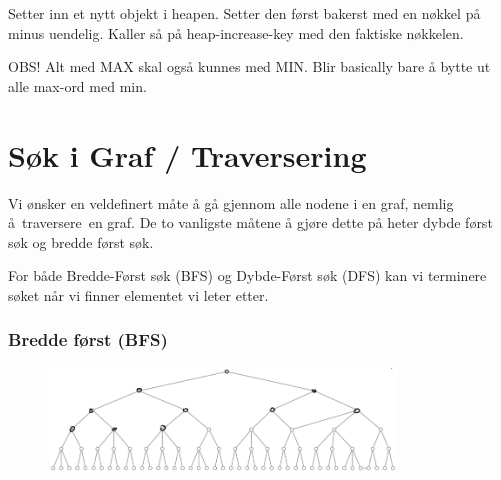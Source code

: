 \documentclass[12pt]{report}
\begin{document}
Setter inn et nytt objekt i heapen. Setter den først bakerst med en nøkkel på minus uendelig. Kaller så på heap-increase-key med den faktiske nøkkelen. \par


\vspace{\baselineskip}
OBS! Alt med MAX skal også kunnes med MIN. Blir basically bare å bytte ut alle max-ord med min. \par




\newpage

\vspace{\baselineskip}\setlength{\parskip}{15.0pt}
\section*{Søk i Graf / Traversering}
\setlength{\parskip}{0.0pt}
Vi ønsker en veldefinert måte å gå gjennom alle nodene i en graf, nemlig å traversere en graf. De to vanligste måtene å gjøre dette på heter dybde først søk og bredde først søk.\par

\setlength{\parskip}{10.56pt}
For både Bredde-Først søk (BFS) og Dybde-Først søk (DFS) kan vi terminere søket når vi finner elementet vi leter etter.\par


\vspace{\baselineskip}
\setlength{\parskip}{6.0pt}
\subsubsection*{Bredde først (BFS)}



\begin{figure}[H]
\advance\leftskip 3.29in		\includegraphics[width=3.64in,height=1.09in]{./media/image96.png}
\end{figure}
\end{document}

